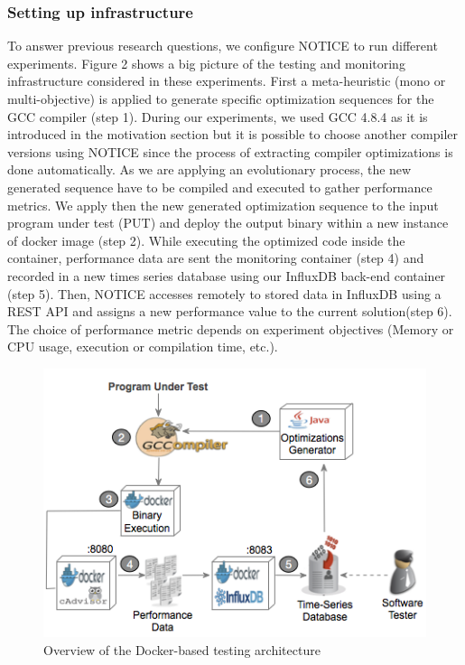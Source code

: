 \subsubsection{Setting up infrastructure}
To answer previous research questions, we configure NOTICE to run different experiments. Figure 2 shows a big picture of the testing and monitoring infrastructure considered in these experiments. 
First a meta-heuristic (mono or multi-objective) is applied to generate specific optimization sequences for the GCC compiler (step 1). During our experiments, we used GCC 4.8.4 as it is introduced in the motivation section but it is possible to choose another compiler versions using NOTICE since the process of extracting compiler optimizations is done automatically. As we are applying an evolutionary process, the new generated sequence have to be compiled and executed to gather performance metrics. We apply then the new generated optimization sequence to the input program under test (PUT) and deploy the output binary within a new instance of docker image (step 2). While executing the optimized code inside the container, performance data are sent the monitoring container (step 4) and recorded in a new times series database using our InfluxDB back-end container (step 5). Then, NOTICE accesses remotely to stored data in InfluxDB using a REST API and assigns a new performance value to the current solution(step 6). The choice of performance metric depends on experiment objectives (Memory or CPU usage, execution or compilation time, etc.).
\begin{figure}[h]
	\centering
	\includegraphics[width=0.9\linewidth]{Ressources/infraup.png}
	\caption{Overview of the Docker-based testing architecture}
\end{figure}







